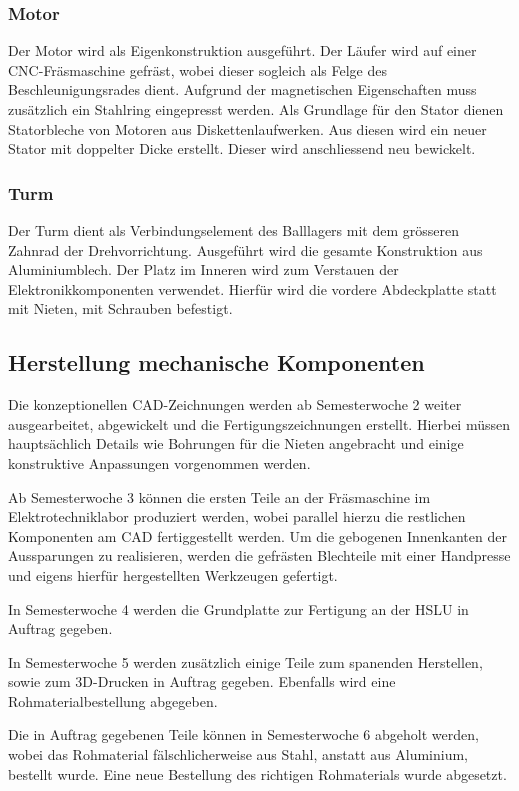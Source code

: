 \subsubsection{Motor}
Der Motor wird als Eigenkonstruktion ausgeführt. Der Läufer wird auf einer 
CNC-Fräsmaschine gefräst, wobei dieser sogleich als Felge des 
Beschleunigungsrades dient. Aufgrund der magnetischen Eigenschaften muss 
zusätzlich ein Stahlring eingepresst werden. Als Grundlage für den Stator 
dienen Statorbleche von Motoren aus Diskettenlaufwerken. Aus diesen wird ein 
neuer Stator mit doppelter Dicke erstellt. Dieser wird anschliessend neu 
bewickelt. 

\subsubsection{Turm}
Der Turm dient als Verbindungselement des Balllagers mit dem grösseren Zahnrad 
der Drehvorrichtung. Ausgeführt wird die gesamte Konstruktion aus 
Aluminiumblech. Der Platz im Inneren wird zum Verstauen der 
Elektronikkomponenten verwendet. Hierfür wird die vordere Abdeckplatte statt 
mit Nieten, mit Schrauben befestigt.

\clearpage
\subsection{Herstellung mechanische Komponenten}
Die konzeptionellen CAD-Zeichnungen werden ab Semesterwoche 2 weiter 
ausgearbeitet, abgewickelt und die Fertigungszeichnungen erstellt. Hierbei 
müssen hauptsächlich Details wie Bohrungen für die Nieten angebracht und 
einige konstruktive Anpassungen vorgenommen werden. 

Ab Semesterwoche 3 können die ersten Teile an der Fräsmaschine im 
Elektrotechniklabor produziert werden, wobei parallel  hierzu die restlichen 
Komponenten am CAD fertiggestellt werden.  Um die gebogenen Innenkanten der 
Aussparungen zu realisieren, werden die gefrästen Blechteile mit einer 
Handpresse und eigens hierfür hergestellten Werkzeugen gefertigt.

In Semesterwoche 4 werden die Grundplatte zur Fertigung an der HSLU in Auftrag 
gegeben.

In Semesterwoche 5 werden zusätzlich einige Teile zum spanenden Herstellen, 
sowie zum 3D-Drucken in Auftrag gegeben. Ebenfalls wird eine 
Rohmaterialbestellung abgegeben.

Die in Auftrag gegebenen Teile können in Semesterwoche 6 abgeholt werden, 
wobei das  Rohmaterial fälschlicherweise aus Stahl, anstatt aus Aluminium, 
bestellt wurde. Eine neue Bestellung des richtigen Rohmaterials wurde abgesetzt.

